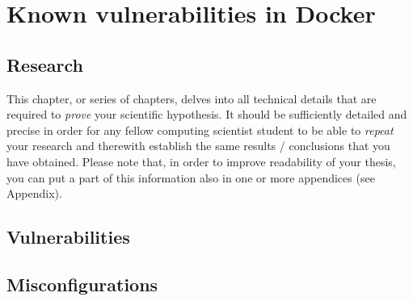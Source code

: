 \chapter{Known vulnerabilities in Docker}

\section{Research}
This chapter, or series of chapters, delves into all technical details that are
required to \emph{prove} your scientific hypothesis.
It should be sufficiently detailed and precise in order for any fellow computing scientist student to be able to \emph{repeat}
your research and therewith establish the same results / conclusions that you have obtained.
Please note that, in order to improve readability of your thesis, you can put a part of this information also in one or
more appendices (see Appendix).


\section{Vulnerabilities}
\section{Misconfigurations}
